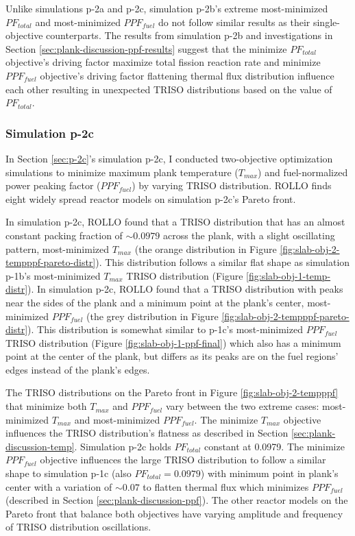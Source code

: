 Unlike simulations p-2a and p-2c, simulation p-2b's extreme most-minimized $PF_{total}$ 
and most-minimized $PPF_{fuel}$ do not follow similar results as their single-objective 
counterparts.  
The results from simulation p-2b and investigations in Section 
\ref{sec:plank-discussion-ppf-results} suggest that the minimize $PF_{total}$ 
objective's driving factor maximize total fission reaction rate and 
minimize $PPF_{fuel}$ objective's driving factor flattening thermal flux distribution 
influence each other resulting in unexpected TRISO distributions based 
on the value of $PF_{total}$. 

\subsubsection{Simulation p-2c}
In Section \ref{sec:p-2c}'s simulation p-2c, I conducted two-objective 
optimization simulations to minimize maximum plank temperature ($T_{max}$) and 
fuel-normalized power peaking factor ($PPF_{fuel}$) by varying TRISO distribution. 
\gls{ROLLO} finds eight widely spread reactor models on simulation p-2c's Pareto 
front. 

In simulation p-2c, \gls{ROLLO} found that a TRISO distribution that has an almost 
constant packing fraction of $\sim0.0979$ across the plank, with a 
slight oscillating pattern, most-minimized $T_{max}$ 
(the orange distribution in Figure \ref{fig:slab-obj-2-tempppf-pareto-distr}). 
This distribution follows a similar flat shape as simulation p-1b's most-minimized 
$T_{max}$ TRISO distribution (Figure \ref{fig:slab-obj-1-temp-distr}).
In simulation p-2c, \gls{ROLLO} found that a TRISO distribution with peaks near the 
sides of the plank and a minimum point at the plank's center, most-minimized 
$PPF_{fuel}$ (the grey distribution in Figure 
\ref{fig:slab-obj-2-tempppf-pareto-distr}). 
This distribution is somewhat similar to p-1c's most-minimized $PPF_{fuel}$ TRISO 
distribution (Figure \ref{fig:slab-obj-1-ppf-final}) which also has a minimum point 
at the center of the plank, but differs as its peaks are on the fuel regions' edges 
instead of the plank's edges. 

The \gls{TRISO} distributions on the Pareto front in Figure \ref{fig:slab-obj-2-tempppf} 
that minimize both $T_{max}$ and $PPF_{fuel}$ vary between the two extreme cases: 
most-minimized $T_{max}$ and most-minimized $PPF_{fuel}$. 
The minimize $T_{max}$ objective influences the TRISO distribution's flatness as 
described in Section \ref{sec:plank-discussion-temp}.
Simulation p-2c holds $PF_{total}$ constant at 0.0979. 
The minimize $PPF_{fuel}$ objective influences the large TRISO distribution to follow 
a similar shape to simulation p-1c (also $PF_{total} = 0.0979$) with minimum point in 
plank's center with a variation of $\sim0.07$ to flatten thermal flux which 
minimizes $PPF_{fuel}$ (described in Section \ref{sec:plank-discussion-ppf}). 
The other reactor models on the Pareto front that balance both objectives have 
varying amplitude and frequency of TRISO distribution oscillations. 

